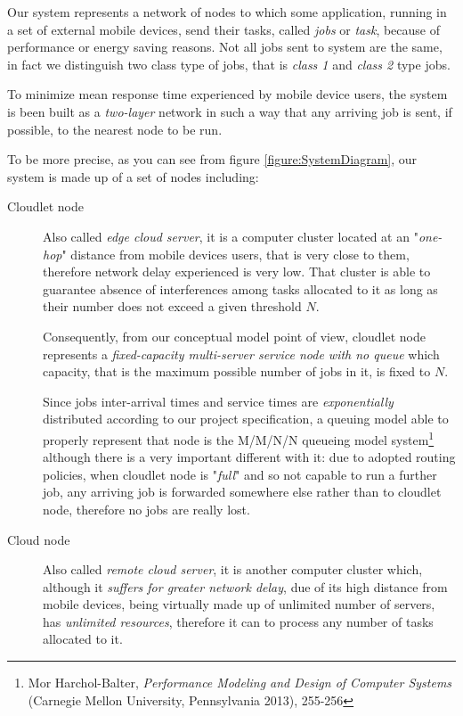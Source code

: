 \documentclass[10pt,a4paper]{article}
\begin{document}
Our system represents a network of nodes to which some application, running in a set of external mobile devices, send their tasks, called \textit{jobs} or \textit{task}, because of performance or energy saving reasons. Not all jobs sent to system are the same, in fact we distinguish two class type of jobs, that is \textit{class 1} and \textit{class 2} type jobs.

To minimize mean response time experienced by mobile device users, the system is been built as a \textit{two-layer} network in such a way that any arriving job is sent, if possible, to the nearest node to be run.

To be more precise, as you can see from figure \ref{figure:SystemDiagram}, our system is made up of a set of nodes including:

\begin{description}
\item[Cloudlet node] Also called \textit{edge cloud server}, it is a computer cluster located at an "\textit{one-hop}" distance from mobile devices users, that is very close to them, therefore network delay experienced is very low. That cluster is able to guarantee absence of interferences among tasks allocated to it as long as their number does not exceed a given threshold $N$. 

Consequently, from our conceptual model point of view, cloudlet node represents a \textit{fixed-capacity multi-server service node with no queue} which capacity, that is the maximum possible number of jobs in it, is fixed to $N$. 

Since jobs inter-arrival times and service times are \textit{exponentially} distributed according to our project specification, a queuing model able to properly represent that node is the M/M/N/N queueing model system\footnote{Mor Harchol-Balter, \textit{Performance Modeling and Design of Computer Systems} (Carnegie Mellon University, Pennsylvania 2013), 255-256} although there is a very important different with it: due to adopted routing policies, when cloudlet node is "\textit{full}" and so not capable to run a further job, any arriving job is forwarded somewhere else rather than to cloudlet node, therefore no jobs are really lost.

\item[Cloud node] Also called \textit{remote cloud server}, it is another computer cluster which, although it \textit{suffers for greater network delay}, due of its high distance from mobile devices, being virtually made up of unlimited number of servers, has \textit{unlimited resources}, therefore it can to process any number of tasks allocated to it. 


\end{description}
\end{document}
